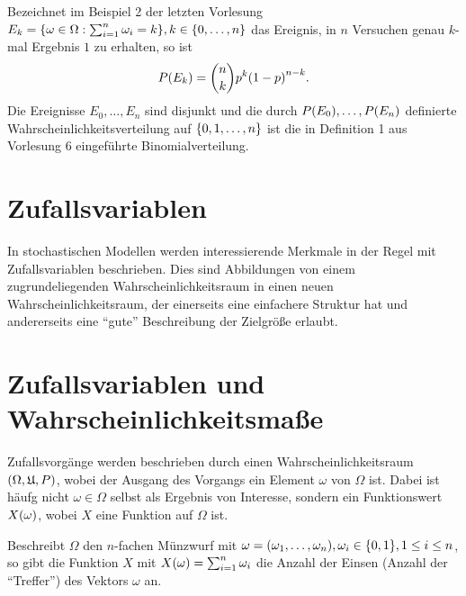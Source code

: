 \documentclass{lecture}
\begin{document}
    \begin{example}
        Bezeichnet im Beispiel 2 der letzten Vorlesung \(E_k = \braces*{\omega \in \Omega : \sum_{i = 1}^n \omega_i = k}, k \in \braces*{0, \ldots, n}\) das Ereignis, in \(n\) Versuchen genau \(k\)-mal Ergebnis \(1\) zu erhalten, so ist
        \[
            P\parentheses*{E_k} = \binom{n}{k}p^k\parentheses*{1 - p}^{n - k}.
        \]
        Die Ereignisse \(E_0, \ldots, E_n\) sind disjunkt und die durch \(P\parentheses*{E_0}, \ldots, P\parentheses*{E_n}\) definierte Wahrscheinlichkeitsverteilung auf \(\braces*{0, 1, \ldots, n}\) ist die in Definition 1 aus Vorlesung 6 eingeführte Binomialverteilung.
    \end{example}


    \section*{Zufallsvariablen}

    In stochastischen Modellen werden interessierende Merkmale in der Regel mit Zufallsvariablen beschrieben.
    Dies sind Abbildungen von einem zugrundeliegenden Wahrscheinlichkeitsraum in einen neuen Wahrscheinlichkeitsraum, der einerseits eine einfachere Struktur hat und andererseits eine ``gute'' Beschreibung der Zielgröße erlaubt.


    \section*{Zufallsvariablen und Wahrscheinlichkeitsmaße}

    Zufallsvorgänge werden beschrieben durch einen Wahrscheinlichkeitsraum \(\parentheses*{\Omega, \mathfrak{U}, P}\), wobei der Ausgang des Vorgangs ein Element \(\omega\) von \(\Omega\) ist.
    Dabei ist häufg nicht \(\omega \in \Omega\) selbst als Ergebnis von Interesse, sondern ein Funktionswert \(X\parentheses*{\omega}\), wobei \(X\) eine Funktion auf \(\Omega\) ist.

    \begin{example}
        Beschreibt \(\Omega\) den \(n\)-fachen Münzwurf mit \(\omega = \parentheses*{\omega_1, \ldots, \omega_n}, \omega_i \in \braces*{0, 1}, 1 \le i \le n\), so gibt die Funktion \(X\) mit \(X\parentheses*{\omega} = \sum_{i = 1}^n \omega_i\) die Anzahl der Einsen (Anzahl der ``Treffer'') des Vektors \(\omega\) an.
    \end{example}
\end{document}
